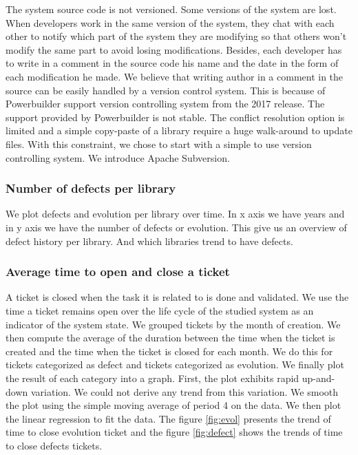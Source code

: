 \documentclass[10pt,conference]{IEEEtran}
\begin{document}
The system source code is not versioned.  Some versions of the system are lost. 
When developers work in the same version of the system, they chat with each other to notify which part of the system they are modifying so that others won't modify the same part to avoid losing modifications. Besides, each developer has to write in a comment in the source code his name and the date in the form of each modification he made.  We believe that writing author in a comment in the source can be easily handled by a version control system.
This is because of Powerbuilder support version controlling system from the 2017 release. 
The support provided by Powerbuilder is not stable.
The conflict resolution option is limited and a simple copy-paste of a library require a huge walk-around to update files. 
With this constraint, we chose to start with a simple to use version controlling system. We introduce Apache Subversion. 

 \subsubsection{Number of defects per library}

We plot  defects and evolution per library over time.  In x axis we have years and in y axis  we have the number of defects  or evolution.
This give us an overview of defect  history per library. And  which libraries   trend to have defects.

\subsubsection{ Average time to open and close a ticket}

A ticket is closed when the task it is related to is done and validated. 
We use the time a ticket remains open over the life cycle of the studied system as an indicator of the system state. 
We grouped tickets by the month of creation.
We then compute the average of  the duration between the time when the ticket is created and the time when the ticket is closed for each month.  
We do this for tickets categorized as defect and tickets categorized as evolution. 
We finally plot the result of each category into a graph.  First, the plot exhibits rapid up-and-down variation.
We could not derive any trend from this variation. 
We smooth the plot using the simple moving average of period 4 on the data.  
We then plot the linear regression to fit the data.  
The figure \ref{fig:evol} presents the trend of time to close evolution ticket and  the figure \ref{fig:defect} shows  the trends  of time to close defects tickets.
\end{document}
